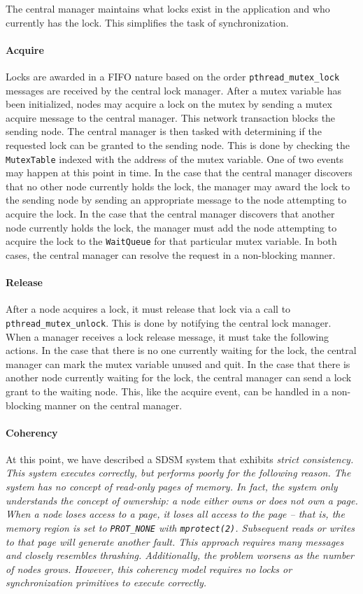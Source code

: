 The central manager maintains what locks exist in the application and who currently has the lock.  This simplifies the task of synchronization.

\paragraph{Acquire}
Locks are awarded in a FIFO nature based on the order \verb,pthread_mutex_lock, messages are received by the central lock manager.  After a mutex variable has been initialized, nodes may acquire a lock on the mutex by sending a mutex acquire message to the central manager.  This network transaction blocks the sending node.  The central manager is then tasked with determining if the requested lock can be granted to the sending node.  This is done by checking the \verb,MutexTable, indexed with the address of the mutex variable.  One of two events may happen at this point in time.  In the case that the central manager discovers that no other node currently holds the lock, the manager may award the lock to the sending node by sending an appropriate message to the node attempting to acquire the lock.  In the case that the central manager discovers that another node currently holds the lock, the manager must add the node attempting to acquire the lock to the \verb,WaitQueue, for that particular mutex variable.  In both cases, the central manager can resolve the request in a non-blocking manner.

\paragraph{Release}
After a node acquires a lock, it must release that lock via a call to \verb,pthread_mutex_unlock,.  This is done by notifying the central lock manager.  When a manager receives a lock release message, it must take the following actions.  In the case that there is no one currently waiting for the lock, the central manager can mark the mutex variable unused and quit.  In the case that there is another node currently waiting for the lock, the central manager can send a lock grant to the waiting node.  This, like the acquire event, can be handled in a non-blocking manner on the central manager.

\paragraph{Coherency}
At this point, we have described a SDSM system that exhibits \em strict consistency\em.  This system executes correctly, but performs poorly for the following reason.  The system has no concept of read-only pages of memory.  In fact, the system only understands the concept of ownership: a node either owns or does not own a page.  When a node loses access to a page, it loses \em all \em access to the page -- that is, the memory region is set to \verb,PROT_NONE, with \verb,mprotect(2),.  Subsequent reads or writes to that page will generate another fault.  This approach requires many messages and closely resembles thrashing.  Additionally, the problem worsens as the number of nodes grows.  However, this coherency model requires no locks or synchronization primitives to execute correctly.

